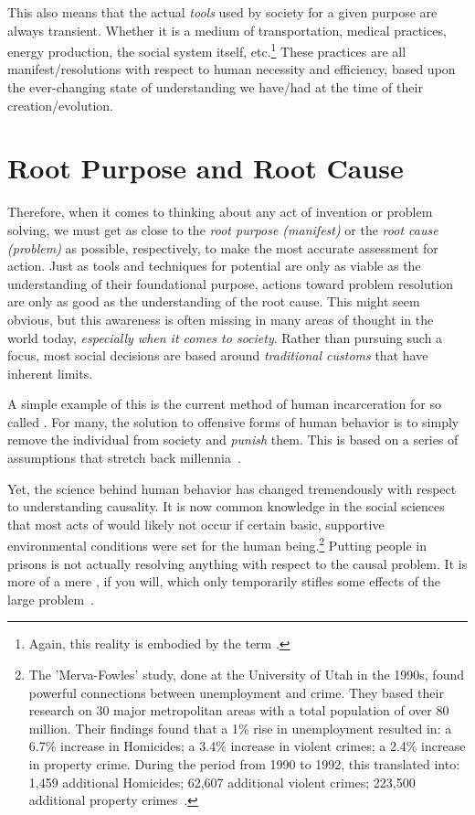 \documentclass[10pt, a4paper, cleardoubleempty, openright, twoside]{book}
\begin{document}
This also means that the actual \emph{tools} used by society for a given
purpose are always transient. Whether it is a medium of transportation,
medical practices, energy production, the social system itself,
etc.\footnote{
	Again, this reality is embodied by the term .
} 
These practices are all manifest/resolutions with respect to human
necessity and efficiency, based upon the ever-changing state of
understanding we have/had at the time of their creation/evolution.

\section{Root Purpose and Root Cause}
 
Therefore, when it comes to thinking about any act of invention or
problem solving, we must get as close to the \emph{root purpose
(manifest)} or the \emph{root cause (problem)} as possible,
respectively, to make the most accurate assessment for action. Just as
tools and techniques for potential are only as viable as the
understanding of their foundational purpose, actions toward problem
resolution are only as good as the understanding of the root cause. This
might seem obvious, but this awareness is often missing in many areas of
thought in the world today, \emph{especially when it comes to society}.
Rather than pursuing such a focus, most social decisions are based
around \emph{traditional customs} that have inherent limits.

A simple example of this is the current method of human incarceration
for so called . For many, the solution to
	offensive forms of human behavior is to simply remove the individual
	from society and \emph{punish} them. This is based on a series of
	assumptions that stretch back millennia~\cite{Gilligan::96}.

Yet, the science behind human behavior has changed tremendously with
respect to understanding causality. It is now common knowledge in the
social sciences that most acts of  would likely not
occur if certain basic, supportive environmental conditions were set for
the human being.\footnote{
	The 'Merva-Fowles' study, done at the University of Utah in the 1990s,
	found powerful connections between unemployment and crime. They based
	their research on 30 major metropolitan areas with a total population
	of over 80 million. Their findings found that a 1\% rise in
	unemployment resulted in: a 6.7\% increase in Homicides; a 3.4\%
	increase in violent crimes; a 2.4\% increase in property crime. During
	the period from 1990 to 1992, this translated into: 1,459 additional
	Homicides; 62,607 additional violent crimes; 223,500 additional
	property crimes~\cite{Merva:EPIReports:92}.
} 
Putting people in prisons is not actually resolving anything with
respect to the causal problem. It is more of a mere ,
if you will, which only temporarily stifles some effects of the large 
problem~\cite{McLeish:http:14}.
\end{document}

